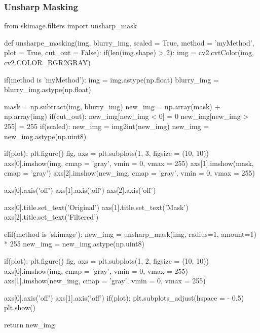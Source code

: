 \documentclass{article}
\begin{document}
\newpage
\subsubsection{Unsharp Masking}
\label{cod:unsharp_mask}
\begin{python}
from skimage.filters import unsharp_mask

def unsharpe_masking(img, blurry_img, scaled = True, method = 'myMethod', plot = True, cut_out = False):
	if(len(img.shape) > 2):
		img = cv2.cvtColor(img, cv2.COLOR_BGR2GRAY)
	
	if(method is 'myMethod'):
		img = img.astype(np.float)
		blurry_img = blurry_img.astype(np.float)
		
		mask = np.subtract(img, blurry_img)
		new_img = np.array(mask) + np.array(img)
		if(cut_out):
			new_img[new_img < 0] = 0
			new_img[new_img > 255] = 255
		if(scaled):
			new_img = img2int(new_img)
		new_img = new_img.astype(np.uint8)
		
		if(plot):
			plt.figure()
			fig, axs = plt.subplots(1, 3, figsize = (10, 10))
			axs[0].imshow(img, cmap = 'gray', vmin = 0, vmax = 255)
			axs[1].imshow(mask, cmap = 'gray')
			axs[2].imshow(new_img, cmap = 'gray', vmin = 0, vmax = 255)
			
			axs[0].axis('off')
			axs[1].axis('off')
			axs[2].axis('off')
			
			axs[0].title.set_text('Original')
			axs[1].title.set_text('Mask')
			axs[2].title.set_text('Filtered')
	
		elif(method is 'skimage'):
			new_img = unsharp_mask(img, radius=1, amount=1) * 255
			new_img = new_img.astype(np.uint8)
	
			if(plot):
				plt.figure()
				fig, axs = plt.subplots(1, 2, figsize = (10, 10))
				axs[0].imshow(img, cmap = 'gray', vmin = 0, vmax = 255)
				axs[1].imshow(new_img, cmap = 'gray', vmin = 0, vmax = 255)
				
				axs[0].axis('off')
				axs[1].axis('off')
				if(plot):
				plt.subplots_adjust(hspace = - 0.5)
				plt.show()
				
	return new_img
\end{python}

\newpage
\end{document}
